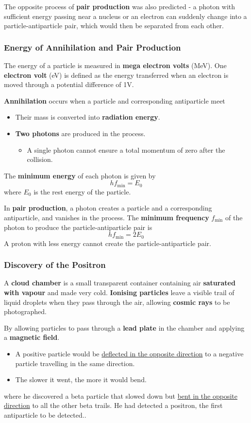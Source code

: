 The opposite process of \textbf{pair production} was also predicted - a photon with sufficient energy passing near a nucleus or an electron can suddenly change into a particle-antiparticle pair, which would then be separated from each other.

\subsubsection*{Energy of Annihilation and Pair Production}

The energy of a particle is measured in \textbf{mega electron volts} (MeV). One \textbf{electron volt} (eV) is defined as the energy transferred when an electron is moved through a potential difference of 1V.

\textbf{Annihilation} occurs when a particle and corresponding antiparticle meet
\begin{itemize}
    \item Their mass is converted into \textbf{radiation energy}.
    \item \textbf{Two photons} are produced in the process.
        \begin{itemize}
            \item A single photon cannot ensure a total momentum of zero after the collision.
        \end{itemize}
\end{itemize}

The \textbf{minimum energy} of each photon is given by
$$hf_\text{min}=E_0$$
where $E_0$ is the rest energy of the particle.

In \textbf{pair production}, a photon creates a particle and a corresponding antiparticle, and vanishes in the process. The \textbf{minimum frequency} $f_\text{min}$ of the photon to produce the particle-antiparticle pair is
$$hf_\text{min}=2E_0$$
A proton with less energy cannot create the particle-antiparticle pair.

\subsubsection*{Discovery of the Positron}

A \textbf{cloud chamber} is a small transparent container containing air \textbf{saturated with vapour} and made very cold. \textbf{Ionising particles} leave a visible trail of liquid droplets when they pass through the air, allowing \textbf{cosmic rays} to be photographed.

By allowing particles to pass through a \textbf{lead plate} in the chamber and applying a \textbf{magnetic field}.
\begin{itemize}
    \item A positive particle would be \underline{deflected in the opposite direction} to a negative particle travelling in the same direction.
    \item The slower it went, the more it would bend.
\end{itemize}
where he discovered a beta particle that slowed down but \underline{bent in the opposite direction} to all the other beta trails. He had detected a positron, the first antiparticle to be detected..
